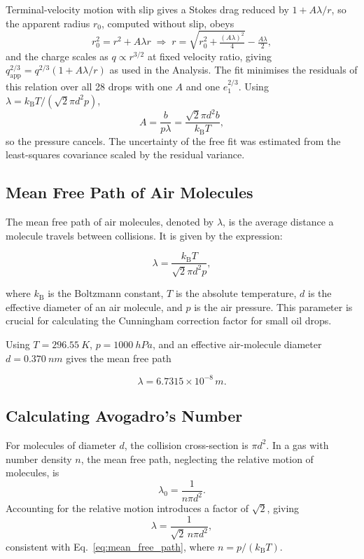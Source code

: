\documentclass[12pt,a4paper]{article}
\begin{document}
Terminal-velocity motion with slip gives a Stokes drag reduced by
$1+A\lambda/r$, so the apparent radius $r_0$, computed without slip, obeys
\begin{equation}
    r_0^2=r^2+A\lambda r
    \;\Rightarrow\;
    r=\sqrt{r_0^2+\tfrac{(A\lambda)^2}{4}}-\tfrac{A\lambda}{2},
\end{equation}
and the charge scales as $q\propto r^{3/2}$ at fixed velocity ratio, giving
$q_{\mathrm{app}}^{2/3}=q^{2/3}(1+A\lambda/r)$ as used in the Analysis. The fit
minimises the residuals of this relation over all 28 drops with one $A$
and one $e_1^{2/3}$. Using $\lambda=k_{\mathrm{B}}T/(\sqrt{2}\pi d^2p)$,
\begin{equation}
    A=\frac{b}{p\lambda}=\frac{\sqrt{2}\pi d^2 b}{k_{\mathrm{B}}T},
\end{equation}
so the pressure cancels. The uncertainty of the free fit was estimated from
the least-squares covariance scaled by the residual variance.

\subsection{Mean Free Path of Air Molecules}

The mean free path of air molecules, denoted by $\lambda$, is the average distance a molecule travels between collisions. It is given by the expression:

\begin{equation}
    \lambda = \frac{k_{\mathrm{B}} T}{\sqrt{2} \pi d^2 p},
    \label{eq:mean_free_path}
\end{equation}

where $k_{\mathrm{B}}$ is the Boltzmann constant, $T$ is the absolute temperature, $d$ is the effective diameter of an air molecule, and $p$ is the air pressure. This parameter is crucial for calculating the Cunningham correction factor for small oil drops.

Using $T=\SI{296.55}{K}$, $p=\SI{1000}{hPa}$, and an effective air-molecule
diameter $d=\SI{0.370}{nm}$ gives the mean free path

\[
    \lambda = 6.7315\times10^{-8}\,\si{m}.
\]

\subsection{Calculating Avogadro's Number}

For molecules of diameter $d$, the collision cross-section is
$\pi d^2$. In a gas with number density $n$, the mean free path,
neglecting the relative motion of molecules, is
\[
\lambda_0 = \frac{1}{n\pi d^2}.
\]
Accounting for the relative motion introduces a factor of $\sqrt{2}$,
giving
\[
\lambda = \frac{1}{\sqrt{2}\,n\pi d^2},
\]
consistent with Eq.~\ref{eq:mean_free_path}, where
$n=p/(k_{\mathrm{B}}T)$.
\end{document}
